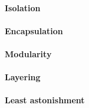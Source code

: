 \paragraph{Isolation}

\paragraph{Encapsulation}

\paragraph{Modularity}

\paragraph{Layering}

\paragraph{Least astonishment}
